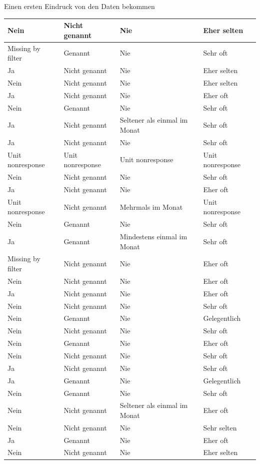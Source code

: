 \documentclass[ignorenonframetext,]{beamer}
\begin{document}
\begin{frame}{Einen ersten Eindruck von den Daten bekommen}
\begin{tabular}{l|l|l|l}
\hline
Nein & Nicht genannt & Nie & Eher selten\\
\hline
Missing by filter & Genannt & Nie & Sehr oft\\
\hline
Ja & Nicht genannt & Nie & Eher selten\\
\hline
Nein & Nicht genannt & Nie & Eher selten\\
\hline
Ja & Nicht genannt & Nie & Eher oft\\
\hline
Nein & Genannt & Nie & Sehr oft\\
\hline
Ja & Nicht genannt & Seltener als einmal im Monat & Sehr oft\\
\hline
Ja & Nicht genannt & Nie & Sehr oft\\
\hline
Unit nonresponse & Unit nonresponse & Unit nonresponse & Unit nonresponse\\
\hline
Nein & Nicht genannt & Nie & Sehr oft\\
\hline
Ja & Nicht genannt & Nie & Eher oft\\
\hline
Unit nonresponse & Nicht genannt & Mehrmals im Monat & Unit nonresponse\\
\hline
Nein & Genannt & Nie & Sehr oft\\
\hline
Ja & Genannt & Mindestens einmal im Monat & Sehr oft\\
\hline
Missing by filter & Nicht genannt & Nie & Eher oft\\
\hline
Nein & Nicht genannt & Nie & Eher oft\\
\hline
Ja & Nicht genannt & Nie & Eher oft\\
\hline
Nein & Nicht genannt & Nie & Sehr oft\\
\hline
Nein & Genannt & Nie & Gelegentlich\\
\hline
Nein & Nicht genannt & Nie & Sehr oft\\
\hline
Nein & Genannt & Nie & Eher oft\\
\hline
Nein & Nicht genannt & Nie & Sehr oft\\
\hline
Ja & Nicht genannt & Nie & Sehr oft\\
\hline
Ja & Genannt & Nie & Gelegentlich\\
\hline
Nein & Genannt & Nie & Sehr oft\\
\hline
Nein & Nicht genannt & Seltener als einmal im Monat & Eher oft\\
\hline
Nein & Nicht genannt & Nie & Sehr selten\\
\hline
Ja & Genannt & Nie & Eher oft\\
\hline
Nein & Nicht genannt & Nie & Eher selten\\

\end{tabular}
\end{frame}
\end{document}
